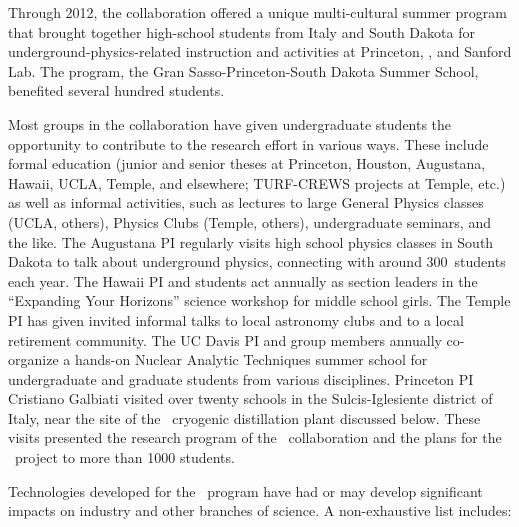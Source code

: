 Through 2012, the collaboration offered a unique multi-cultural summer program that brought together high-school students from Italy and South Dakota for underground-physics-related instruction and activities at Princeton, \LNGS, and Sanford Lab.  The program, the Gran Sasso-Princeton-South Dakota Summer School, benefited several hundred students.

Most groups in the collaboration have given undergraduate students the opportunity to contribute to the research effort in various ways.  These include formal education (junior and senior theses at Princeton, Houston, Augustana, Hawaii, UCLA, Temple, and elsewhere; TURF-CREWS projects at Temple, etc.) as well as informal activities, such as lectures to large General Physics classes (UCLA, others), Physics Clubs (Temple, others),  undergraduate seminars, and the like. The Augustana PI regularly visits high school physics classes in South Dakota to talk about underground physics, connecting with around \num{300}~students each year.  The Hawaii PI and students act annually as section leaders in the ``Expanding Your Horizons'' science workshop for middle school girls.  The Temple PI has given invited informal talks to local astronomy clubs and to a local retirement community. The UC Davis PI and group members annually co-organize a hands-on Nuclear Analytic Techniques summer school for undergraduate and graduate students from various disciplines. Princeton PI Cristiano Galbiati visited over twenty schools in the Sulcis-Iglesiente district of Italy, near the site of the \Aria\ cryogenic distillation plant discussed below.  These visits presented the research program of the \GADMC\ collaboration and the plans for the \Aria\ project to more than \num{1000} students.

Technologies developed for the \DSs\ program have had or may develop significant impacts on industry and other branches of science.  A non-exhaustive list includes:

